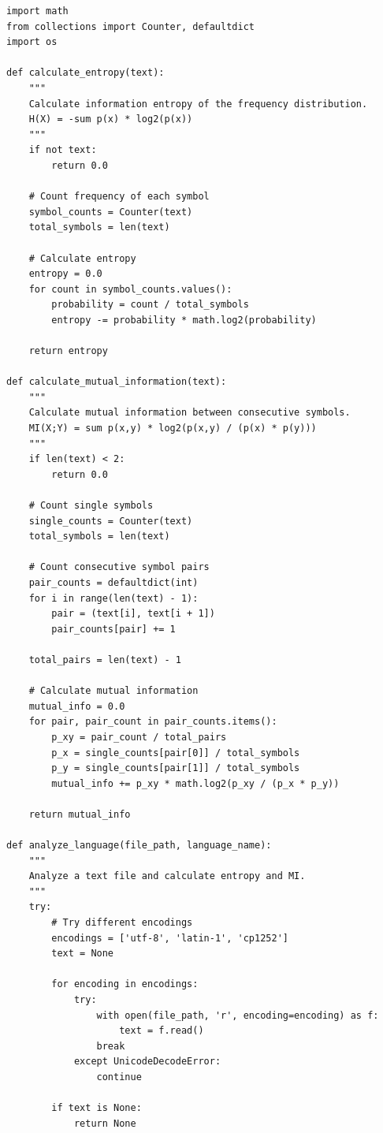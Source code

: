 \documentclass[12pt]{article}
\begin{document}
\begin{lstlisting}[caption={main.py - Language Complexity Analysis Tool}]
import math
from collections import Counter, defaultdict
import os

def calculate_entropy(text):
    """
    Calculate information entropy of the frequency distribution.
    H(X) = -sum p(x) * log2(p(x))
    """
    if not text:
        return 0.0
    
    # Count frequency of each symbol
    symbol_counts = Counter(text)
    total_symbols = len(text)
    
    # Calculate entropy
    entropy = 0.0
    for count in symbol_counts.values():
        probability = count / total_symbols
        entropy -= probability * math.log2(probability)
    
    return entropy

def calculate_mutual_information(text):
    """
    Calculate mutual information between consecutive symbols.
    MI(X;Y) = sum p(x,y) * log2(p(x,y) / (p(x) * p(y)))
    """
    if len(text) < 2:
        return 0.0
    
    # Count single symbols
    single_counts = Counter(text)
    total_symbols = len(text)
    
    # Count consecutive symbol pairs
    pair_counts = defaultdict(int)
    for i in range(len(text) - 1):
        pair = (text[i], text[i + 1])
        pair_counts[pair] += 1
    
    total_pairs = len(text) - 1
    
    # Calculate mutual information
    mutual_info = 0.0
    for pair, pair_count in pair_counts.items():
        p_xy = pair_count / total_pairs
        p_x = single_counts[pair[0]] / total_symbols
        p_y = single_counts[pair[1]] / total_symbols
        mutual_info += p_xy * math.log2(p_xy / (p_x * p_y))
    
    return mutual_info

def analyze_language(file_path, language_name):
    """
    Analyze a text file and calculate entropy and MI.
    """
    try:
        # Try different encodings
        encodings = ['utf-8', 'latin-1', 'cp1252']
        text = None
        
        for encoding in encodings:
            try:
                with open(file_path, 'r', encoding=encoding) as f:
                    text = f.read()
                break
            except UnicodeDecodeError:
                continue
        
        if text is None:
            return None
        

\end{lstlisting}
\end{document}

